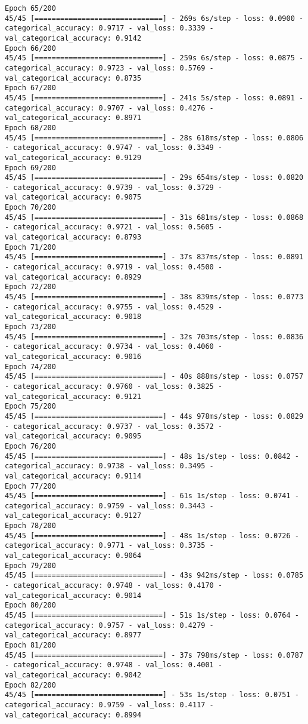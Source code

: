 \begin{lstlisting}
Epoch 65/200
45/45 [==============================] - 269s 6s/step - loss: 0.0900 - categorical_accuracy: 0.9717 - val_loss: 0.3339 - val_categorical_accuracy: 0.9142
Epoch 66/200
45/45 [==============================] - 259s 6s/step - loss: 0.0875 - categorical_accuracy: 0.9723 - val_loss: 0.5769 - val_categorical_accuracy: 0.8735
Epoch 67/200
45/45 [==============================] - 241s 5s/step - loss: 0.0891 - categorical_accuracy: 0.9707 - val_loss: 0.4276 - val_categorical_accuracy: 0.8971
Epoch 68/200
45/45 [==============================] - 28s 618ms/step - loss: 0.0806 - categorical_accuracy: 0.9747 - val_loss: 0.3349 - val_categorical_accuracy: 0.9129
Epoch 69/200
45/45 [==============================] - 29s 654ms/step - loss: 0.0820 - categorical_accuracy: 0.9739 - val_loss: 0.3729 - val_categorical_accuracy: 0.9075
Epoch 70/200
45/45 [==============================] - 31s 681ms/step - loss: 0.0868 - categorical_accuracy: 0.9721 - val_loss: 0.5605 - val_categorical_accuracy: 0.8793
Epoch 71/200
45/45 [==============================] - 37s 837ms/step - loss: 0.0891 - categorical_accuracy: 0.9719 - val_loss: 0.4500 - val_categorical_accuracy: 0.8929
Epoch 72/200
45/45 [==============================] - 38s 839ms/step - loss: 0.0773 - categorical_accuracy: 0.9755 - val_loss: 0.4529 - val_categorical_accuracy: 0.9018
Epoch 73/200
45/45 [==============================] - 32s 703ms/step - loss: 0.0836 - categorical_accuracy: 0.9734 - val_loss: 0.4060 - val_categorical_accuracy: 0.9016
Epoch 74/200
45/45 [==============================] - 40s 888ms/step - loss: 0.0757 - categorical_accuracy: 0.9760 - val_loss: 0.3825 - val_categorical_accuracy: 0.9121
Epoch 75/200
45/45 [==============================] - 44s 978ms/step - loss: 0.0829 - categorical_accuracy: 0.9737 - val_loss: 0.3572 - val_categorical_accuracy: 0.9095
Epoch 76/200
45/45 [==============================] - 48s 1s/step - loss: 0.0842 - categorical_accuracy: 0.9738 - val_loss: 0.3495 - val_categorical_accuracy: 0.9114
Epoch 77/200
45/45 [==============================] - 61s 1s/step - loss: 0.0741 - categorical_accuracy: 0.9759 - val_loss: 0.3443 - val_categorical_accuracy: 0.9127
Epoch 78/200
45/45 [==============================] - 48s 1s/step - loss: 0.0726 - categorical_accuracy: 0.9771 - val_loss: 0.3735 - val_categorical_accuracy: 0.9064
Epoch 79/200
45/45 [==============================] - 43s 942ms/step - loss: 0.0785 - categorical_accuracy: 0.9748 - val_loss: 0.4170 - val_categorical_accuracy: 0.9014
Epoch 80/200
45/45 [==============================] - 51s 1s/step - loss: 0.0764 - categorical_accuracy: 0.9757 - val_loss: 0.4279 - val_categorical_accuracy: 0.8977
Epoch 81/200
45/45 [==============================] - 37s 798ms/step - loss: 0.0787 - categorical_accuracy: 0.9748 - val_loss: 0.4001 - val_categorical_accuracy: 0.9042
Epoch 82/200
45/45 [==============================] - 53s 1s/step - loss: 0.0751 - categorical_accuracy: 0.9759 - val_loss: 0.4117 - val_categorical_accuracy: 0.8994
\end{lstlisting}

